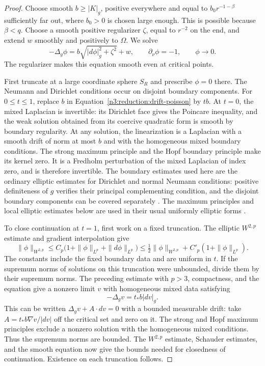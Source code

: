 \begin{proof}
Choose smooth $b\ge|K|_g$, positive everywhere and equal to
$b_0r^{-1-\beta}$ sufficiently far out, where $b_0>0$ is chosen large
enough.  This is possible because $\beta<q$.  Choose a smooth positive
regularizer $\zeta$, equal to $r^{-2}$ on the end, and extend $w$ smoothly
and positively to $\Omega$.  We solve
\begin{equation}
 \label{n3:reduction:drift-poisson}
 -\Delta_g\phi=b\sqrt{|d\phi|_g^2+\zeta^2}+w,
 \qquad \partial_\nu\phi=-1,
 \qquad \phi\longrightarrow0.
\end{equation}
The regularizer makes this equation smooth even at critical points.

First truncate at a large coordinate sphere $S_R$ and prescribe
$\phi=0$ there.  The Neumann and Dirichlet conditions occur on disjoint
boundary components.  For $0\le t\le1$, replace $b$ in
Equation~\eqref{n3:reduction:drift-poisson} by $tb$.  At $t=0$, the mixed
Laplacian is invertible: its Dirichlet face gives the Poincare inequality,
and the weak solution obtained from its coercive quadratic form is smooth
by boundary regularity.  At any solution, the linearization is a
Laplacian with a smooth drift of norm at most $b$ and with the homogeneous
mixed boundary conditions.  The strong maximum principle and the Hopf
boundary principle make its kernel zero.  It is a Fredholm perturbation
of the mixed Laplacian of index zero, and is therefore invertible.
The boundary estimates used here are the ordinary elliptic estimates
for Dirichlet and normal Neumann conditions: positive definiteness of
$g$ verifies their principal complementing condition, and the disjoint
boundary components can be covered separately
\cite{AgmonDouglisNirenberg1959}.  The maximum principles and local
elliptic estimates below are used in their usual uniformly elliptic
forms \cite{GilbargTrudinger}.

To close continuation at $t=1$, first work on a fixed truncation.
The elliptic $W^{2,p}$ estimate
and gradient interpolation give
\[
 \|\phi\|_{W^{2,p}}
 \le C_p\bigl(1+\|\phi\|_{L^p}+\|d\phi\|_{L^p}\bigr)
 \le \tfrac12\|\phi\|_{W^{2,p}}
       +C'_p(1+\|\phi\|_{L^p}).
\]
The constants include the fixed boundary data and are uniform in $t$.
If the supremum norms of solutions on this truncation were unbounded,
divide them by their supremum norms.  The preceding estimate with
$p>3$, compactness, and the equation give a nonzero limit $v$ with
homogeneous mixed data satisfying
\[
 -\Delta_gv=t_*b|dv|_g.
\]
This can be written $\Delta_gv+A\cdot dv=0$ with a bounded measurable
drift: take $A=t_*b\nabla v/|dv|$ off the critical set and zero on it.
The strong and Hopf maximum principles exclude a nonzero solution with
the homogeneous mixed conditions.  Thus the supremum norms are bounded.
The $W^{2,p}$ estimate, Schauder estimates, and the smooth equation now
give the bounds needed for closedness of continuation.  Existence on
each truncation follows.


\end{proof}
